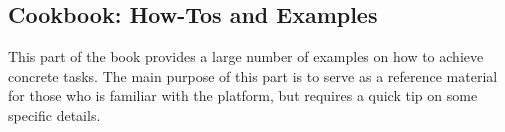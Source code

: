 \begin{partbacktext}
\part{Cookbook: How-Tos and Examples}
  This part of the book provides a large number of examples on how to achieve concrete tasks.
  The main purpose of this part is to serve as a reference material for those who is familiar with the platform, but requires a quick tip on some specific details.
\end{partbacktext}